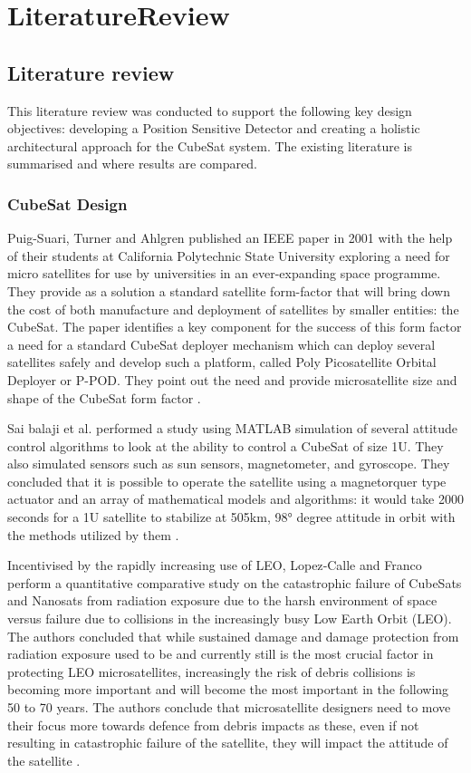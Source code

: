 \chapter{LiteratureReview}

\section{Literature review}
This literature review was conducted to support the following key design objectives: developing a Position Sensitive Detector and creating a holistic architectural approach for the CubeSat system. The existing literature is summarised and where results are compared.

\subsection{CubeSat Design}
Puig-Suari, Turner and Ahlgren published an IEEE paper in 2001 with the help of their students at California Polytechnic State University exploring a need for micro satellites for use by universities in an ever-expanding space programme. They provide as a solution a standard satellite form-factor that will bring down the cost of both manufacture and deployment of satellites by smaller entities: the CubeSat. The paper identifies a key component for the success of this form factor a need for a standard CubeSat deployer mechanism which can deploy several satellites safely and develop such a platform, called Poly Picosatellite Orbital Deployer or P-POD. They point out the need and provide microsatellite size and shape of the CubeSat form factor \cite{Puig-Suari2001}.

Sai balaji et al. performed a study using MATLAB simulation of several attitude control algorithms to look at the ability to control a CubeSat of size 1U. They also simulated sensors such as sun sensors, magnetometer, and gyroscope. They concluded that it is possible to operate the satellite using a magnetorquer type actuator and an array of mathematical models and algorithms: it would take 2000 seconds for a 1U satellite to stabilize at 505km, 98° degree attitude in orbit with the methods utilized by them \cite{Balaji2023}.

Incentivised by the rapidly increasing use of LEO, Lopez‑Calle and Franco perform a quantitative comparative study on the catastrophic failure of CubeSats and Nanosats from radiation exposure due to the harsh environment of space versus failure due to collisions in the increasingly busy Low Earth Orbit (LEO). The authors concluded that while sustained damage and damage protection from radiation exposure used to be and currently still is the most crucial factor in protecting LEO microsatellites, increasingly the risk of debris collisions is becoming more important and will become the most important in the following 50 to 70 years. The authors conclude that microsatellite designers need to move their focus more towards defence from debris impacts as these, even if not resulting in catastrophic failure of the satellite, they will impact the attitude of the satellite \cite{Lopez-Calle2023}.

